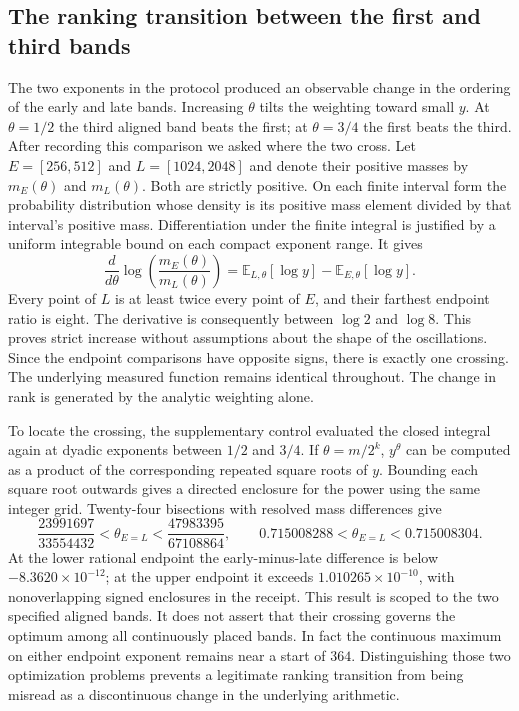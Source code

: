 \documentclass[12pt,letterpaper]{article}
\begin{document}
\subsection{The ranking transition between the first and third bands}

The two exponents in the protocol produced an observable change in the ordering of the early and late bands. Increasing $\theta$ tilts the weighting toward small $y$. At $\theta=1/2$ the third aligned band beats the first; at $\theta=3/4$ the first beats the third. After recording this comparison we asked where the two cross. Let $E=[256,512]$ and $L=[1024,2048]$ and denote their positive masses by $m_E(\theta)$ and $m_L(\theta)$. Both are strictly positive. On each finite interval form the probability distribution whose density is its positive mass element divided by that interval's positive mass. Differentiation under the finite integral is justified by a uniform integrable bound on each compact exponent range. It gives
\[
 \frac{d}{d\theta}\log\!\left(\frac{m_E(\theta)}{m_L(\theta)}\right)
 = \mathbb{E}_{L,\theta}[\log y]-\mathbb{E}_{E,\theta}[\log y].
\]
Every point of $L$ is at least twice every point of $E$, and their farthest endpoint ratio is eight. The derivative is consequently between $\log2$ and $\log8$. This proves strict increase without assumptions about the shape of the oscillations. Since the endpoint comparisons have opposite signs, there is exactly one crossing. The underlying measured function remains identical throughout. The change in rank is generated by the analytic weighting alone.

To locate the crossing, the supplementary control evaluated the closed integral again at dyadic exponents between $1/2$ and $3/4$. If $\theta=m/2^k$, $y^\theta$ can be computed as a product of the corresponding repeated square roots of $y$. Bounding each square root outwards gives a directed enclosure for the power using the same integer grid. Twenty-four bisections with resolved mass differences give
\[
 \frac{23991697}{33554432}
 < \theta_{E=L} <
 \frac{47983395}{67108864},
 \qquad 0.715008288 < \theta_{E=L} < 0.715008304 .
\]
At the lower rational endpoint the early-minus-late difference is below $-8.3620\times10^{-12}$; at the upper endpoint it exceeds $1.010265\times10^{-10}$, with nonoverlapping signed enclosures in the receipt. This result is scoped to the two specified aligned bands. It does not assert that their crossing governs the optimum among all continuously placed bands. In fact the continuous maximum on either endpoint exponent remains near a start of $364$. Distinguishing those two optimization problems prevents a legitimate ranking transition from being misread as a discontinuous change in the underlying arithmetic.
\end{document}
